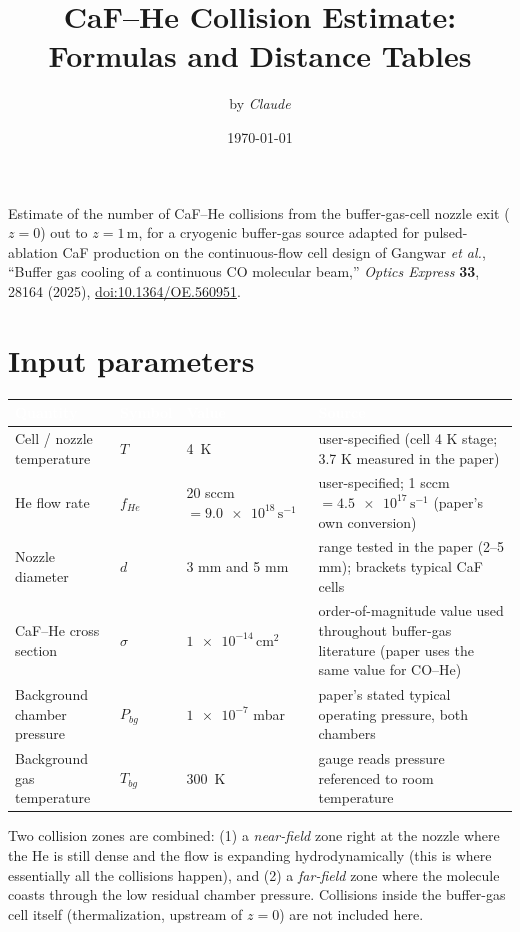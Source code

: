 \documentclass[11pt]{article}
\title{\textbf{CaF--He Collision Estimate: Formulas and Distance Tables}}
\author{by \emph{Claude}}
\date{\today}
\newcommand{\hdr}[1]{\textcolor{white}{\textbf{#1}}}
\begin{document}
\maketitle
\vspace{-2.5em}

\noindent
Estimate of the number of CaF--He collisions from the buffer-gas-cell nozzle exit ($z=0$) out to
$z = 1\,\text{m}$, for a cryogenic buffer-gas source adapted for pulsed-ablation CaF production on the
continuous-flow cell design of Gangwar \textit{et al.}, ``Buffer gas cooling of a continuous CO
molecular beam,'' \textit{Optics Express} \textbf{33}, 28164 (2025),
\href{https://doi.org/10.1364/OE.560951}{doi:10.1364/OE.560951}.

\section*{Input parameters}

\begin{center}
\begin{tabular}{@{}p{3.3cm}p{1.4cm}p{3.0cm}p{6.3cm}@{}}
\toprule
\rowcolor{hdrblue}
\hdr{Quantity} & \hdr{Symbol} & \hdr{Value} & \hdr{Source} \\
\midrule
Cell / nozzle temperature & $T$ & \SI{4}{K} & user-specified (cell 4 K stage; 3.7 K measured in the paper) \\
\rowcolor{rowgray} He flow rate & $f_{He}$ & 20 sccm $= \num{9.0e18}\,\text{s}^{-1}$ & user-specified; 1 sccm $=\num{4.5e17}\,\text{s}^{-1}$ (paper's own conversion) \\
Nozzle diameter & $d$ & 3 mm and 5 mm & range tested in the paper (2--5 mm); brackets typical CaF cells \\
\rowcolor{rowgray} CaF--He cross section & $\sigma$ & $\num{1e-14}\,\text{cm}^2$ & order-of-magnitude value used throughout buffer-gas literature (paper uses the same value for CO--He) \\
Background chamber pressure & $P_{bg}$ & $\num{1e-7}$ mbar & paper's stated typical operating pressure, both chambers \\
\rowcolor{rowgray} Background gas temperature & $T_{bg}$ & \SI{300}{K} & gauge reads pressure referenced to room temperature \\
\bottomrule
\end{tabular}
\end{center}

\vspace{0.3cm}
\noindent Two collision zones are combined: (1) a \emph{near-field} zone right at the nozzle where the
He is still dense and the flow is expanding hydrodynamically (this is where essentially all the
collisions happen), and (2) a \emph{far-field} zone where the molecule coasts through the low residual
chamber pressure. Collisions inside the buffer-gas cell itself (thermalization, upstream of $z=0$) are
not included here.
\end{document}
